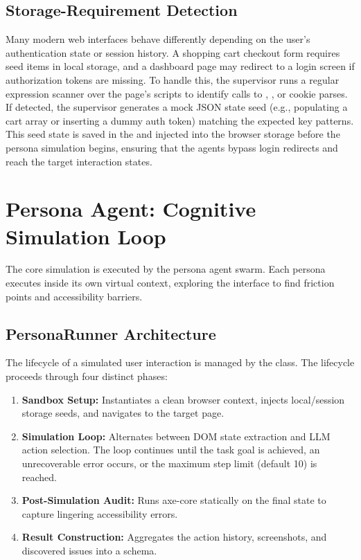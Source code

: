 \subsection{Storage-Requirement Detection}
\label{sec:storage-seed}

Many modern web interfaces behave differently depending on the user's authentication state or session history. A shopping cart checkout form requires seed items in local storage, and a dashboard page may redirect to a login screen if authorization tokens are missing. To handle this, the supervisor runs a regular expression scanner over the page's scripts to identify calls to , , or cookie parses. If detected, the supervisor generates a mock JSON state seed (e.g., populating a cart array or inserting a dummy auth token) matching the expected key patterns. This seed state is saved in the  and injected into the browser storage before the persona simulation begins, ensuring that the agents bypass login redirects and reach the target interaction states.


\section{Persona Agent: Cognitive Simulation Loop}
\label{sec:persona-agent}

The core simulation is executed by the persona agent swarm. Each persona executes inside its own virtual context, exploring the interface to find friction points and accessibility barriers.

\subsection{PersonaRunner Architecture}
\label{sec:persona-runner}

The lifecycle of a simulated user interaction is managed by the  class. The lifecycle proceeds through four distinct phases:
\begin{enumerate}
    \item \textbf{Sandbox Setup:} Instantiates a clean browser context, injects local/session storage seeds, and navigates to the target page.
    \item \textbf{Simulation Loop:} Alternates between DOM state extraction and LLM action selection. The loop continues until the task goal is achieved, an unrecoverable error occurs, or the maximum step limit (default 10) is reached.
    \item \textbf{Post-Simulation Audit:} Runs axe-core statically on the final state to capture lingering accessibility errors.
    \item \textbf{Result Construction:} Aggregates the action history, screenshots, and discovered issues into a  schema.
\end{enumerate}

